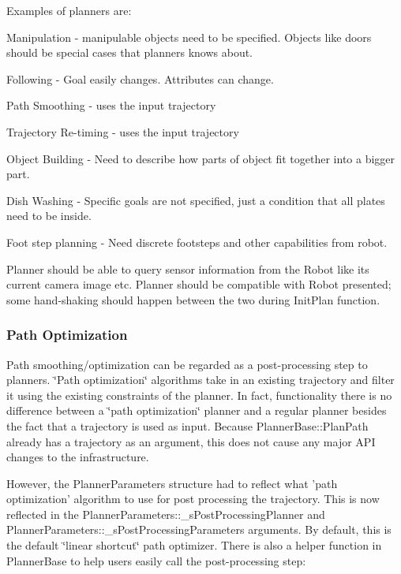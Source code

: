 Examples of planners are:
\begin{DoxyItemize}
\item Manipulation -\/ manipulable objects need to be specified. Objects like doors should be special cases that planners knows about.
\item Following -\/ Goal easily changes. Attributes can change.
\item Path Smoothing -\/ uses the input trajectory
\item Trajectory Re-\/timing -\/ uses the input trajectory
\item Object Building -\/ Need to describe how parts of object fit together into a bigger part.
\item Dish Washing -\/ Specific goals are not specified, just a condition that all plates need to be inside.
\item Foot step planning -\/ Need discrete footsteps and other capabilities from robot.
\end{DoxyItemize}

Planner should be able to query sensor information from the Robot like its current camera image etc. Planner should be compatible with Robot presented; some hand-\/shaking should happen between the two during InitPlan function.\hypertarget{arch__planner_planner_pathoptimization}{}\subsubsection{Path Optimization}\label{arch__planner_planner_pathoptimization}
Path smoothing/optimization can be regarded as a post-\/processing step to planners. \char`\"{}Path optimization\char`\"{} algorithms take in an existing trajectory and filter it using the existing constraints of the planner. In fact, functionality there is no difference between a \char`\"{}path optimization\char`\"{} planner and a regular planner besides the fact that a trajectory is used as input. Because PlannerBase::PlanPath already has a trajectory as an argument, this does not cause any major API changes to the infrastructure.

However, the PlannerParameters structure had to reflect what 'path optimization' algorithm to use for post processing the trajectory. This is now reflected in the PlannerParameters::\_\-sPostProcessingPlanner and PlannerParameters::\_\-sPostProcessingParameters arguments. By default, this is the default \char`\"{}linear shortcut\char`\"{} path optimizer. There is also a helper function in PlannerBase to help users easily call the post-\/processing step:


